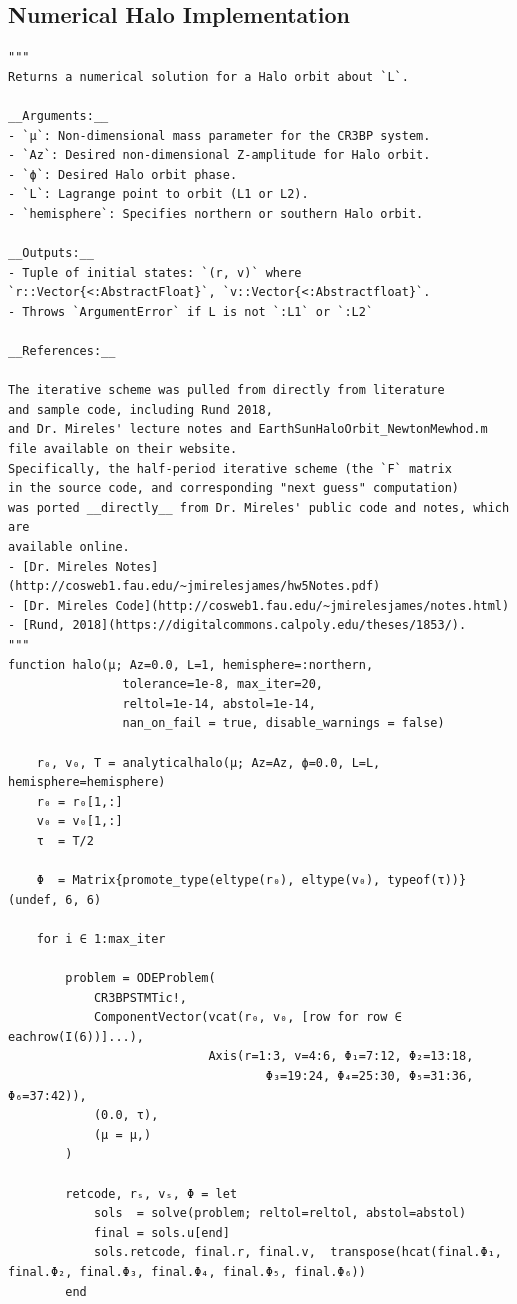 \documentclass[conf]{new-aiaa}
\begin{document}
\subsection*{Numerical Halo Implementation}
\begin{verbatim}
"""
Returns a numerical solution for a Halo orbit about `L`.

__Arguments:__ 
- `μ`: Non-dimensional mass parameter for the CR3BP system.
- `Az`: Desired non-dimensional Z-amplitude for Halo orbit.
- `ϕ`: Desired Halo orbit phase.
- `L`: Lagrange point to orbit (L1 or L2).
- `hemisphere`: Specifies northern or southern Halo orbit.

__Outputs:__
- Tuple of initial states: `(r, v)` where `r::Vector{<:AbstractFloat}`, `v::Vector{<:Abstractfloat}`.
- Throws `ArgumentError` if L is not `:L1` or `:L2`

__References:__

The iterative scheme was pulled from directly from literature
and sample code, including Rund 2018,
and Dr. Mireles' lecture notes and EarthSunHaloOrbit_NewtonMewhod.m 
file available on their website.
Specifically, the half-period iterative scheme (the `F` matrix
in the source code, and corresponding "next guess" computation) 
was ported __directly__ from Dr. Mireles' public code and notes, which are
available online. 
- [Dr. Mireles Notes](http://cosweb1.fau.edu/~jmirelesjames/hw5Notes.pdf)
- [Dr. Mireles Code](http://cosweb1.fau.edu/~jmirelesjames/notes.html)
- [Rund, 2018](https://digitalcommons.calpoly.edu/theses/1853/).
"""
function halo(μ; Az=0.0, L=1, hemisphere=:northern,
                tolerance=1e-8, max_iter=20,
                reltol=1e-14, abstol=1e-14,
                nan_on_fail = true, disable_warnings = false)

    r₀, v₀, Τ = analyticalhalo(μ; Az=Az, ϕ=0.0, L=L, hemisphere=hemisphere)
    r₀ = r₀[1,:]
    v₀ = v₀[1,:]
    τ  = Τ/2

    Φ  = Matrix{promote_type(eltype(r₀), eltype(v₀), typeof(τ))}(undef, 6, 6)

    for i ∈ 1:max_iter

        problem = ODEProblem(
            CR3BPSTMTic!,
            ComponentVector(vcat(r₀, v₀, [row for row ∈ eachrow(I(6))]...),
                            Axis(r=1:3, v=4:6, Φ₁=7:12, Φ₂=13:18,
                                    Φ₃=19:24, Φ₄=25:30, Φ₅=31:36, Φ₆=37:42)),
            (0.0, τ),
            (μ = μ,)
        )    

        retcode, rₛ, vₛ, Φ = let 
            sols  = solve(problem; reltol=reltol, abstol=abstol)
            final = sols.u[end] 
            sols.retcode, final.r, final.v,  transpose(hcat(final.Φ₁, final.Φ₂, final.Φ₃, final.Φ₄, final.Φ₅, final.Φ₆))
        end


\end{verbatim}
\end{document}
